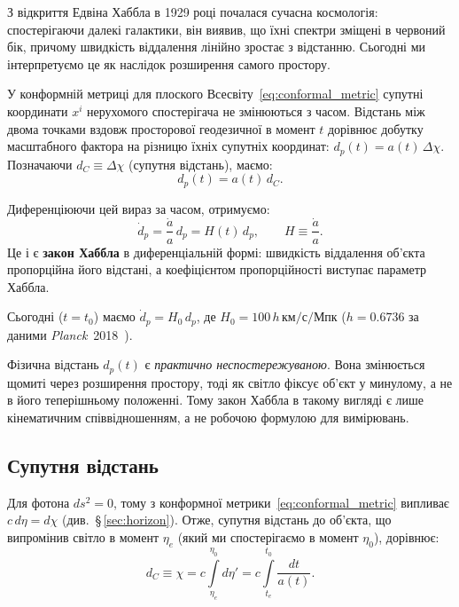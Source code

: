 З відкриття Едвіна Хаббла в 1929 році почалася сучасна космологія:
спостерігаючи далекі галактики, він виявив, що їхні спектри зміщені
в червоний бік, причому швидкість віддалення лінійно зростає з відстанню.
Сьогодні ми інтерпретуємо це як наслідок розширення самого простору.

У конформній метриці для плоского Всесвіту~\eqref{eq:conformal_metric}
супутні координати $x^i$ нерухомого спостерігача не змінюються з часом.
Відстань між двома точками вздовж просторової геодезичної в момент $t$
дорівнює добутку масштабного фактора на різницю їхніх супутніх координат:
$d_p(t) = a(t)\,\Delta \chi$. Позначаючи $d_C \equiv \Delta \chi$ (супутня
відстань), маємо:
\begin{equation}
d_p(t) = a(t)\,d_C.
\end{equation}

Диференціюючи цей вираз за часом, отримуємо:
\begin{equation}\label{eq:hubble_law}
\dot{d}_p = \frac{\dot{a}}{a}\,d_p = H(t)\,d_p, \qquad
H \equiv \frac{\dot{a}}{a}.
\end{equation}
Це і є \textbf{закон Хаббла} в диференціальній формі: швидкість
віддалення об'єкта пропорційна його відстані, а коефіцієнтом
пропорційності виступає параметр Хаббла.

Сьогодні ($t = t_0$) маємо $\dot{d}_p = H_0\,d_p$, де
$H_0 = 100\,h\,\text{км/с/Мпк}$ ($h = 0.6736$ за даними
\textit{Planck}~2018~\cite{planck_2018}).

Фізична відстань $d_p(t)$ є \emph{практично
неспостережуваною}. Вона змінюється щомиті через розширення простору,
тоді як світло фіксує об'єкт у минулому, а не в його теперішньому
положенні. Тому закон Хаббла в такому вигляді є лише кінематичним
співвідношенням, а не робочою формулою для вимірювань.

\subsection*{Супутня відстань}

Для фотона $ds^2 = 0$, тому з конформної метрики~\eqref{eq:conformal_metric}
випливає $c\,d\eta = d\chi$ (див.\ §\,\ref{sec:horizon}). Отже, супутня
відстань до об'єкта, що випромінив світло в момент $\eta_e$ (який ми
спостерігаємо в момент $\eta_0$), дорівнює:
\begin{equation*}
d_C \equiv \chi = c\int\limits_{\eta_e}^{\eta_0} d\eta'
           = c\int\limits_{t_e}^{t_0} \frac{dt}{a(t)}.
\end{equation*}

